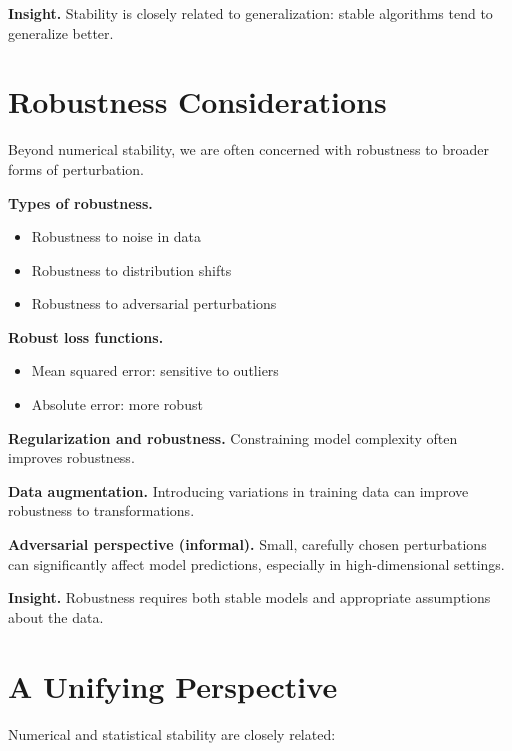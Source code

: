 \noindent
\textbf{Insight.}  
Stability is closely related to generalization: stable algorithms tend to generalize better.

\section{Robustness Considerations}

Beyond numerical stability, we are often concerned with robustness to broader forms of perturbation.

\medskip

\noindent
\textbf{Types of robustness.}
\begin{itemize}
    \item Robustness to noise in data
    \item Robustness to distribution shifts
    \item Robustness to adversarial perturbations
\end{itemize}

\medskip

\noindent
\textbf{Robust loss functions.}
\begin{itemize}
    \item Mean squared error: sensitive to outliers
    \item Absolute error: more robust
\end{itemize}

\medskip

\noindent
\textbf{Regularization and robustness.}  
Constraining model complexity often improves robustness.

\medskip

\noindent
\textbf{Data augmentation.}  
Introducing variations in training data can improve robustness to transformations.

\medskip

\noindent
\textbf{Adversarial perspective (informal).}  
Small, carefully chosen perturbations can significantly affect model predictions, especially in high-dimensional settings.

\medskip

\noindent
\textbf{Insight.}  
Robustness requires both stable models and appropriate assumptions about the data.

\section{A Unifying Perspective}

Numerical and statistical stability are closely related:

